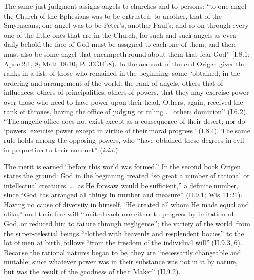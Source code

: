 \noindent The same just judgment assigns angels to churches and to
persons: ``to one angel the Church of the Ephesians was to be entrusted; to
another, that of the Smyrn\ae ans; one angel was to be Peter's, another
Paul's; and so on through every one of the little ones that are in the
Church, for such and such angels as even daily behold the face of God must
be assigned to each one of them; and there must also be some angel that
encampeth round about them that fear God'' (I.8.1; Apoc 2:1, 8; Matt
18:10; Ps 33[34]:8). In the account of the end Origen gives the ranks in a
list: of those who remained in the beginning, some ``obtained, in the
ordering and arrangement of the world, the rank of angels; others that of
influences, others of principalities, others of powers, that they may
exercise power over those who need to have power upon their head. Others,
again, received the rank of thrones, having the office of judging or ruling
\dots\ others dominion'' (I.6.2). ``The angelic office does not exist except
as a consequence of their desert; nor do `powers' exercise power except in
virtue of their moral progress'' (I.8.4). The same rule holds among the
opposing powers, who ``have obtained these degrees in evil in proportion to
their conduct'' (\emph{ibid.}).

The merit is earned ``before this world was formed.'' In the second book
Origen states the ground: God in the beginning created ``so great a number
of rational or intellectual creatures~\dots\ as He foresaw would be
sufficient,'' a definite number, since ``God has arranged all things in
number and measure'' (II.9.1; Wis 11:21). Having no cause of diversity in
himself, ``He created all whom He made equal and alike,'' and their free
will ``incited each one either to progress by imitation of God, or reduced
him to failure through negligence''; the variety of the world, from the
super-celestial beings ``clothed with heavenly and resplendent bodies'' to
the lot of men at birth, follows ``from the freedom of the individual
will'' (II.9.3, 6). Because the rational natures began to be, they are ``necessarily changeable
and mutable; since whatever power was in their substance was not in it by
nature, but was the result of the goodness of their Maker'' (II.9.2).

